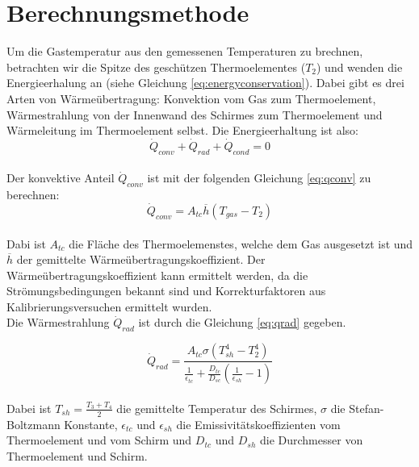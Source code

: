 \chapter{Berechnungsmethode}\label{sec:methodofattack}

Um die Gastemperatur aus den gemessenen Temperaturen zu brechnen, betrachten wir die Spitze des geschützen Thermoelementes ($T_2$) und wenden die Energieerhalung an (siehe Gleichung \ref{eq:energyconservation}). Dabei gibt es drei Arten von Wärmeübertragung: Konvektion vom Gas zum Thermoelement, Wärmestrahlung von der Innenwand des Schirmes zum Thermoelement und Wärmeleitung im Thermoelement selbst. Die Energieerhaltung ist also:\\

\begin{equation}
\dot Q_{conv}+ \dot Q_{rad}+ \dot Q_{cond}=0
\label{eq:energyconservation}
\end{equation}\\

Der konvektive Anteil $\dot Q_{conv}$ ist mit der folgenden Gleichung \ref{eq:qconv} zu berechnen:\\

\begin{equation}
\dot Q_{conv}=A_{tc} \overline h (T_{gas}-T_2)
\label{eq:qconv}
\end{equation}\\

Dabi ist $A_{tc}$ die Fläche des Thermoelemenstes, welche dem Gas ausgesetzt ist und $\overline h$ der gemittelte Wärmeübertragungskoeffizient. Der Wärmeübertragungskoeffizient kann ermittelt werden, da die Strömungsbedingungen bekannt sind und Korrekturfaktoren aus Kalibrierungsversuchen ermittelt wurden.\\

Die Wärmestrahlung $\dot Q_{rad}$ ist durch die Gleichung \ref{eq:qrad} gegeben.

\begin{equation}
\dot Q_{rad}=\frac{A_{tc} \sigma (T_{sh}^4-T_{2}^4 )}{\frac{1}{\epsilon_{tc}}+\frac {D_{tc}}{D_{sc}} (\frac{1}{\epsilon_{sh}}-1) }
\label{eq:qrad}
\end{equation}\\

Dabei ist $T_{sh}=\frac{T_3+T_4}{2}$ die gemittelte Temperatur des Schirmes, $\sigma$ die Stefan-Boltzmann Konstante, $\epsilon_{tc}$ und $\epsilon_{sh}$ die Emissivitätskoeffizienten vom Thermoelement und vom Schirm und $D_{tc}$ und $D_{sh}$ die Durchmesser von Thermoelement und Schirm. \\

